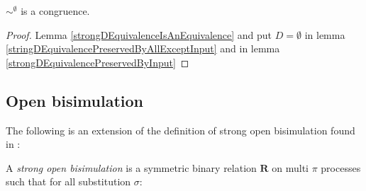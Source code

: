 \begin{theorem}
  $\sim^{\emptyset}$ is a congruence.
  \begin{proof}
    Lemma \ref{strongDEquivalenceIsAnEquivalence} and put $D=\emptyset$ in lemma \ref{stringDEquivalencePreservedByAllExceptInput} and in lemma \ref{strongDEquivalencePreservedByInput}
  \end{proof}
\end{theorem}


\subsection{Open bisimulation}

The following is an extension of the definition of strong open bisimulation found in \cite{parrow}:
\begin{definition}
  A \emph{strong open bisimulation} is a symmetric binary relation $\mathbf{R}$ on multi $\pi$ processes such that for all substitution $\sigma$: 
\end{definition}

